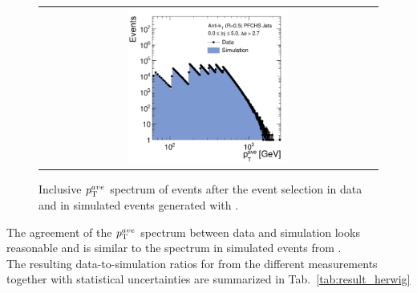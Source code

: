 \begin{figure}[!hp]
  \centering
  \begin{tabular}{c}
                \includegraphics[width=0.49\textwidth]{figures/HerwigPtAve__AfterAsymmHistos.pdf}
  \end{tabular}
  \caption{Inclusive $p_{\text{T}}^{ave}$ spectrum of events after the event selection in data and in simulated events generated with \herwig.}
  \label{fig:control_plots_herwig}
\end{figure}
The agreement of the $p_{\text{T}}^{ave}$ spectrum between data and simulation looks reasonable and is similar to the spectrum in simulated events from \pythia.\\
The resulting data-to-simulation ratios for \herwig from the different measurements together with statistical uncertainties are summarized in Tab.~\ref{tab:result_herwig} 
